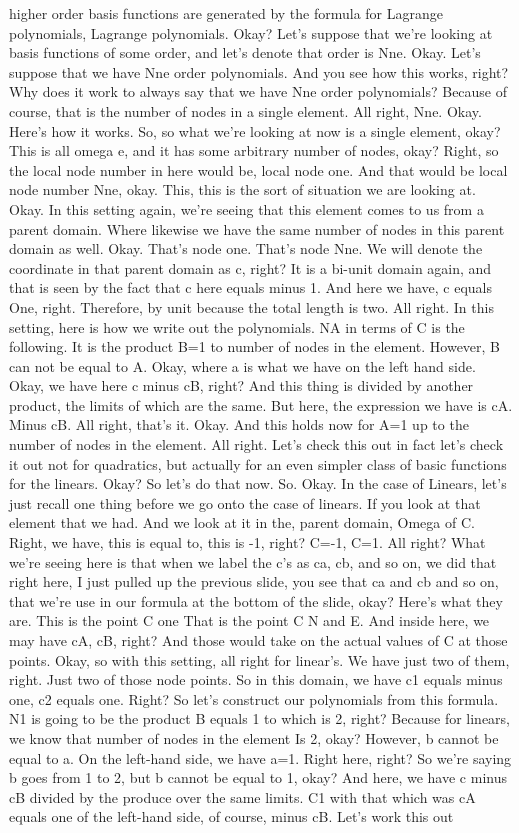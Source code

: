 \documentclass[10pt]{article}
\begin{document}
higher order basis functions are generated by the formula for Lagrange polynomials, Lagrange polynomials. Okay? Let's suppose that we're looking at basis functions of some order, and let's denote that order is Nne. Okay. Let's suppose that we have Nne order polynomials. And you see how this works, right? Why does it work to always say that we have Nne order polynomials? Because of course, that is the number of nodes in a single element. All right, Nne. Okay. Here's how it works. So, so what we're looking at now is a single element, okay? This is all omega e, and it has some arbitrary number of nodes, okay? Right, so the local node number in here would be, local node one. And that would be local node number Nne, okay. This, this is the sort of situation we are looking at. Okay. In this setting again, we're seeing that this element comes to us from a parent domain. Where likewise we have the same number of nodes in this parent domain as well. Okay. That's node one. That's node Nne. We will denote the coordinate in that parent domain as c, right? It is a bi-unit domain again, and that is seen by the fact that c here equals minus 1. And here we have, c equals One, right. Therefore, by unit because the total length is two. All right. In this setting, here is how we write out the polynomials. NA in terms of C is the following. It is the product B=1 to number of nodes in the element. However, B can not be equal to A. Okay, where a is what we have on the left hand side. Okay, we have here c minus cB, right? And this thing is divided by another product, the limits of which are the same. But here, the expression we have is cA. Minus cB. All right, that's it. Okay. And this holds now for A=1 up to the number of nodes in the element. All right. Let's check this out in fact let's check it out not for quadratics, but actually for an even simpler class of basic functions for the linears. Okay? So let's do that now. So. Okay. In the case of Linears, let's just recall one thing before we go onto the case of linears. If you look at that element that we had. And we look at it in the, parent domain, Omega of C. Right, we have, this is equal to, this is -1, right? C=-1, C=1. All right? What we're seeing here is that when we label the c's as ca, cb, and so on, we did that right here, I just pulled up the previous slide, you see that ca and cb and so on, that we're use in our formula at the bottom of the slide, okay? Here's what they are. This is the point C one That is the point C N and E. And inside here, we may have cA, cB, right? And those would take on the actual values of C at those points. Okay, so with this setting, all right for linear's. We have just two of them, right. Just two of those node points. So in this domain, we have c1 equals minus one, c2 equals one. Right? So let's construct our polynomials from this formula. N1 is going to be the product B equals 1 to which is 2, right? Because for linears, we know that number of nodes in the element Is 2, okay? However, b cannot be equal to a. On the left-hand side, we have a=1. Right here, right? So we're saying b goes from 1 to 2, but b cannot be equal to 1, okay? And here, we have c minus cB divided by the produce over the same limits. C1 with that which was cA equals one of the left-hand side, of course, minus cB. Let's work this out 
\end{document}

